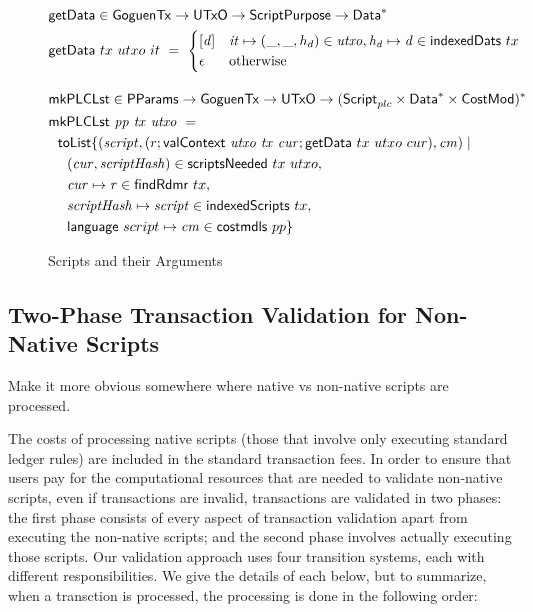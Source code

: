 \begin{figure}[htb]
  \begin{align*}
    & \fun{getData} \in \GoguenTx \to \UTxO \to \ScriptPurpose \to \seqof{\Data} \\
    & \fun{getData}~{tx}~{utxo}~{it}~=~
      \begin{cases}
        [\var{d}] & \var{it} \mapsto (\_, \_, h_d) \in \var{utxo}, \var{h_d}\mapsto \var{d} \in \fun{indexedDats}~{tx} \\
        \epsilon  & \text{otherwise}
      \end{cases}
    \nextdef
    & \fun{mkPLCLst} \in \PParams \to \GoguenTx \to \UTxO \to \seqof{(\ScriptPlutus \times \seqof{\Data} \times \CostMod)} \\
    & \fun{mkPLCLst} ~\var{pp}~\var{tx}~ \var{utxo} ~=~ \\
    & ~~\fun{toList} \{ (\var{script}, (r; \fun{valContext}~\var{utxo}~\var{tx}~\var{cur}; \fun{getData}~{tx}~{utxo}~{cur}), \var{cm}) \mid \\
    & ~~~~(\var{cur}, \var{scriptHash}) \in \fun{scriptsNeeded}~{tx}~{utxo}, \\
    & ~~~~\var{cur} \mapsto \var{r} \in \fun{findRdmr}~{tx}, \\
    & ~~~~\var{scriptHash}\mapsto \var{script}\in \fun{indexedScripts}~{tx}, \\
    & ~~~~\fun{language}~{script} \mapsto \var{cm} \in \fun{costmdls}~{pp} \}
  \end{align*}
  \caption{Scripts and their Arguments}
  \label{fig:functions:script2}
\end{figure}

\subsection{Two-Phase Transaction Validation for Non-Native Scripts}
\label{sec:two-phase}

\begin{note}
  Make it more obvious somewhere where native vs non-native scripts are processed.
\end{note}

The costs of processing native scripts (those that involve only executing standard ledger rules) are included in the standard transaction fees.
In order to ensure that users pay for the computational resources that are needed to validate non-native scripts, even
if transactions are invalid, transactions are validated in two phases:
the first phase consists of every aspect of transaction validation apart from executing the non-native scripts; and
the second phase involves actually executing those scripts.
%
Our validation approach  uses four transition systems, each with different responsibilities. We
give the details of each below, but to summarize, when a transction is processed,
the processing is done
in the following order:


